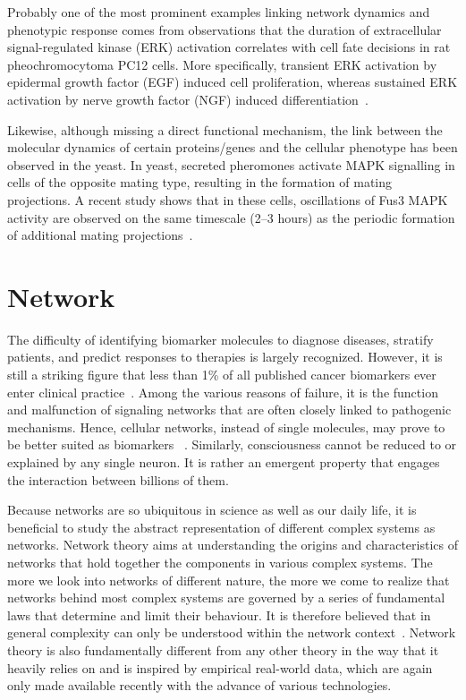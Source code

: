 Probably one of the most prominent examples linking network
dynamics and phenotypic response comes from observations 
that the duration of extracellular signal-regulated kinase (ERK) activation correlates with cell fate decisions in rat pheochromocytoma PC12 cells. More specifically, transient ERK activation by epidermal growth factor (EGF) induced cell proliferation, whereas sustained ERK activation by nerve growth factor (NGF) induced differentiation~\citep{Marshall1995a,Santos2007}.

Likewise, although missing a direct functional mechanism, the link between the molecular 
dynamics of certain proteins/genes and the cellular phenotype has been observed in the yeast.
In yeast, secreted pheromones activate MAPK signalling in cells of the opposite mating type, resulting in the formation of mating projections. A recent study shows that in these cells, oscillations of Fus3 MAPK activity are observed on the same timescale (2--3 hours) as the periodic formation of additional mating projections~\citep{Hilioti2008}. 

\section{Network}
The difficulty of identifying biomarker molecules to diagnose diseases, stratify patients, and predict responses to therapies is
largely recognized. However, it is still a striking figure
that less than 1\% of all published cancer biomarkers ever 
enter clinical practice~\citep{Kern2012}. Among the various
reasons of failure, it is the function and malfunction of signaling networks that are often closely linked to pathogenic mechanisms. Hence, cellular networks, instead of single
molecules, may prove to be better suited as biomarkers~%
\citep{Barabasi2011,Chuang2007,Chu2008}.
Similarly, consciousness cannot be reduced to or explained by any single 
neuron. It is rather an emergent property that engages 
the interaction between billions of them. 

Because networks are so ubiquitous
in science as well as our daily life, it is beneficial to
study the abstract representation of different complex 
systems as networks. Network theory aims at understanding the origins and characteristics of networks that hold together the components in various complex systems. The more we look
into networks of different nature, the more we come to 
realize that networks behind most complex systems are governed by a series of fundamental laws that determine and limit their behaviour. 
It is therefore believed that in general complexity can only be understood within the
network context~\citep{Barabasi2012}. 
Network theory is also fundamentally different
from any other theory in the way that 
it heavily relies on and is inspired by
empirical real-world data, which are again only made 
available recently with the advance of various technologies.
 
